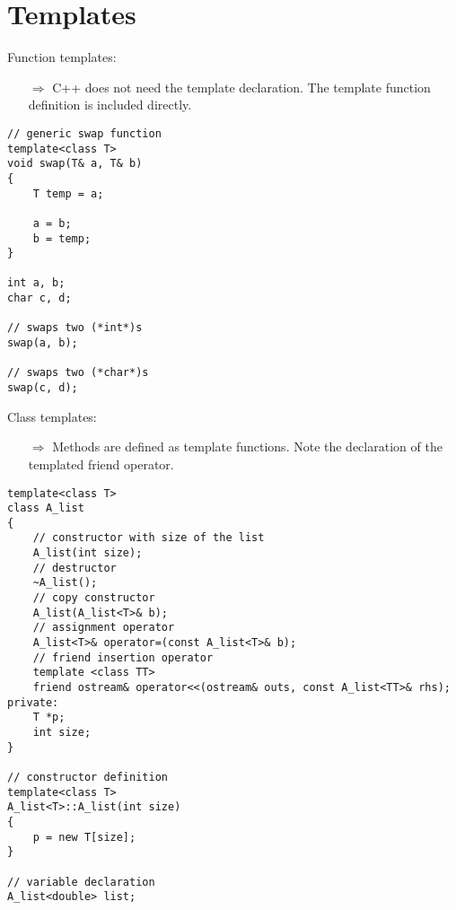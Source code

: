 \documentclass[10pt]{article}
\begin{document}
\section{Templates}
\small
Function templates:
\begin{enumerate}
\item[$\Rightarrow$] C++ does not need the template declaration.
The template function definition is included directly.
\end{enumerate}
\begin{lstlisting}
// generic swap function
template<class T>
void swap(T& a, T& b)
{
    T temp = a;
    
    a = b;
    b = temp;
}

int a, b;
char c, d;

// swaps two (*int*)s
swap(a, b);

// swaps two (*char*)s
swap(c, d);
\end{lstlisting}
Class templates:
\begin{enumerate}
\item[$\Rightarrow$] Methods are defined as template functions.
Note the declaration of the templated friend operator.
\end{enumerate}
\begin{lstlisting}
template<class T>
class A_list
{
    // constructor with size of the list
    A_list(int size);
    // destructor
    ~A_list();
    // copy constructor
    A_list(A_list<T>& b);
    // assignment operator
    A_list<T>& operator=(const A_list<T>& b);
    // friend insertion operator
    template <class TT>
    friend ostream& operator<<(ostream& outs, const A_list<TT>& rhs);
private:
    T *p;
    int size;
}

// constructor definition
template<class T>
A_list<T>::A_list(int size)
{
    p = new T[size];
}

// variable declaration
A_list<double> list;
\end{lstlisting}
%
%
\end{document}
